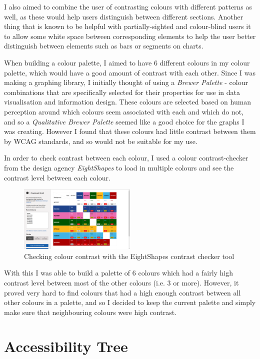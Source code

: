 \documentclass[ %
                    author={Aleena Baig},
                supervisor={Dr Simon Lock},
                    degree={BSc},
                     title={On Making Web Accessible Graphs},
                  subtitle={},
                      year={2019} ]{dissertation}
\begin{document}
I also aimed to combine the user of contrasting colours with different patterns as well, as these would help users distinguish between different sections. Another thing that is known to be helpful with partially-sighted and colour-blind users it to allow some white space between corresponding elements to help the user better distinguish between elements such as bars or segments on charts.

When building a colour palette, I aimed to have 6 different colours in my colour palette, which would have a good amount of contrast with each other. Since I was making a graphing library, I initially thought of using a \textit{Brewer Palette} - colour combinations that are specifically selected for their properties for use in data visualisation and information design. These colours are selected based on human perception around which colours seem associated with each and which do not, and so a \textit{Qualitative Brewer Palette} seemed like a good choice for the graphs I was creating. However I found that these colours had little contrast between them by WCAG standards, and so would not be suitable for my use.

In order to check contrast between each colour, I used a colour contrast-checker from the design agency \textit{EightShapes} to load in multiple colours and see the contrast level between each colour.

\begin{figure}[h]
\caption{Checking colour contrast with the EightShapes contrast checker tool}
\centering
\includegraphics[width=0.5\textwidth]{images/EightShapeColourChecker.png}
\end{figure}

With this I was able to build a palette of 6 colours which had a fairly high contrast level between most of the other colours (i.e. 3 or more). However, it proved very hard to find colours that had a high enough contrast between all other colours in a palette, and so I decided to keep the current palette and simply make sure that neighbouring colours were high contrast.

\section{Accessibility Tree}
\end{document}
